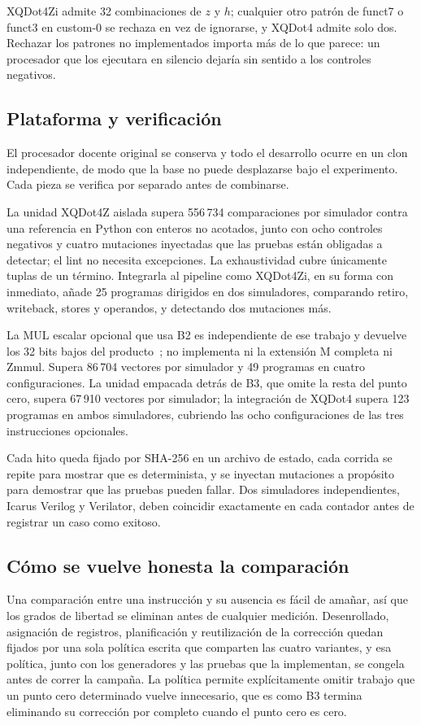 XQDot4Zi admite 32 combinaciones de \(z\) y \(h\); cualquier otro patrón de
funct7 o funct3 en custom-0 se rechaza en vez de ignorarse, y XQDot4 admite solo
dos. Rechazar los patrones no implementados importa más de lo que parece: un
procesador que los ejecutara en silencio dejaría sin sentido a los controles
negativos.

\subsection{Plataforma y verificación}
El procesador docente original se conserva y todo el desarrollo ocurre en un
clon independiente, de modo que la base no puede desplazarse bajo el
experimento. Cada pieza se verifica por separado antes de combinarse.

La unidad XQDot4Z aislada supera 556\,734 comparaciones por simulador contra una
referencia en Python con enteros no acotados, junto con ocho controles negativos
y cuatro mutaciones inyectadas que las pruebas están obligadas a detectar; el
lint no necesita excepciones. La exhaustividad cubre únicamente tuplas de un
término. Integrarla al pipeline como XQDot4Zi, en su forma con inmediato, añade
25 programas dirigidos en dos simuladores, comparando retiro, writeback, stores
y operandos, y detectando dos mutaciones más.

La MUL escalar opcional que usa B2 es independiente de ese trabajo y devuelve
los 32 bits bajos del producto~\cite{riscvm}; no implementa ni la extensión M
completa ni Zmmul. Supera 86\,704 vectores por simulador y 49 programas en
cuatro configuraciones. La unidad empacada detrás de B3, que omite la resta del
punto cero, supera 67\,910 vectores por simulador; la integración de XQDot4
supera 123 programas en ambos simuladores, cubriendo las ocho configuraciones de
las tres instrucciones opcionales.

Cada hito queda fijado por SHA-256 en un archivo de estado, cada corrida se
repite para mostrar que es determinista, y se inyectan mutaciones a propósito
para demostrar que las pruebas pueden fallar. Dos simuladores independientes,
Icarus Verilog y Verilator, deben coincidir exactamente en cada contador antes
de registrar un caso como exitoso.

\subsection{Cómo se vuelve honesta la comparación}
Una comparación entre una instrucción y su ausencia es fácil de amañar, así que
los grados de libertad se eliminan antes de cualquier medición. Desenrollado,
asignación de registros, planificación y reutilización de la corrección quedan
fijados por una sola política escrita que comparten las cuatro variantes, y esa
política, junto con los generadores y las pruebas que la implementan, se congela
antes de correr la campaña. La política permite explícitamente omitir trabajo
que un punto cero determinado vuelve innecesario, que es como B3 termina
eliminando su corrección por completo cuando el punto cero es cero.

